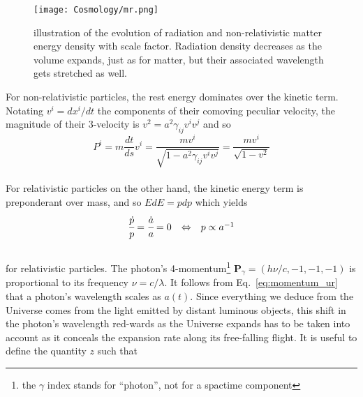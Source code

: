 \begin{figure}
\begin{center}
\texttt{[image: Cosmology/mr.png]}
\caption{illustration of the evolution of radiation and non-relativistic matter energy density with scale factor. Radiation density decreases as the volume expands, just as for matter, but their associated wavelength gets stretched as well.}
\label{fig:expa}
\end{center}
\end{figure}


For non-relativistic particles, the rest energy dominates over the kinetic term. Notating $v^i = dx^i / dt$ the components of their comoving peculiar velocity, the magnitude of their 3-velocity is $v^2 = a^2 \gamma_{ij} v^i v^j$ and so  \\

\begin{equation}
P^i = m \frac{dt}{ds} v^i = \frac{mv^i}{\sqrt{1-a^2 \gamma_{ij} v^i v^j}} = \frac{m v^i}{\sqrt{1-v^2}}
\end{equation} \\
For relativistic particles on the other hand, the kinetic energy term is preponderant over mass, and so $EdE = pdp$ which yields\\

\begin{equation}
\label{eq:momentum_ur}
\begin{array}{ccc}
\cfrac{\dot{p}}{p} = \cfrac{\dot{a}}{a} = 0 & \Leftrightarrow & p \propto a^{-1}
\end{array}
\end{equation} \\ for relativistic particles. The photon's 4-momentum\footnote{the $\gamma$ index stands for ``photon'', not for a spactime component} $\pmb{P}_\gamma = \left( h \nu / c, -1, -1, -1 \right)$ is proportional to its frequency $\nu = c/\lambda$. It follows from Eq.~\ref{eq:momentum_ur} that a photon's wavelength scales as $a(t)$. Since everything we deduce from the Universe comes from the light emitted by distant luminous objects, this shift in the photon's wavelength red-wards as the Universe expands has to be taken into account as it conceals the expansion rate along its free-falling flight. It is useful to define the quantity $z$ such that \\

